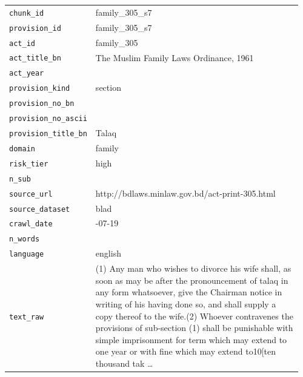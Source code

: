{\footnotesize\setlength{\tabcolsep}{4pt}\renewcommand{\arraystretch}{1.0}
\begin{tabular}{@{}>{\raggedright\arraybackslash}p{0.24\linewidth}>{\raggedright\arraybackslash}p{0.72\linewidth}@{}}
\texttt{chunk\_id} & family\_305\_s7 \\
\texttt{provision\_id} & family\_305\_s7 \\
\texttt{act\_id} & family\_305 \\
\texttt{act\_title\_bn} & The Muslim Family Laws Ordinance, 1961 \\
\texttt{act\_year} & 1961 \\
\texttt{provision\_kind} & section \\
\texttt{provision\_no\_bn} & 7 \\
\texttt{provision\_no\_ascii} & 7 \\
\texttt{provision\_title\_bn} & Talaq \\
\texttt{domain} & family \\
\texttt{risk\_tier} & high \\
\texttt{n\_sub} & 1 \\
\texttt{source\_url} & http://bdlaws.minlaw.gov.bd/act-print-305.html \\
\texttt{source\_dataset} & blad \\
\texttt{crawl\_date} & 2025-07-19 \\
\texttt{n\_words} & 226 \\
\texttt{language} & english \\
\texttt{text\_raw} & (1) Any man who wishes to divorce his wife shall, as soon as may be after the pronouncement of talaq in any form whatsoever, give the Chairman notice in writing of his having done so, and shall supply a copy thereof to the wife.(2) Whoever contravenes the provisions of sub-section (1) shall be punishable with simple imprisonment for term which may extend to one year or with fine which may extend to10{[}ten thousand tak … \\
\end{tabular}}
